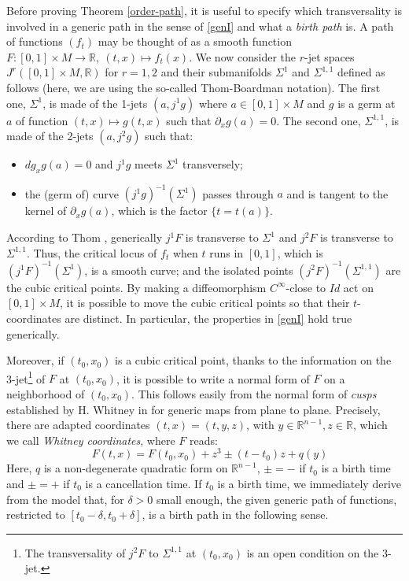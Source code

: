 \documentclass[12pt]{amsart}
\def\R{\mathbb{R}}
\def\de{\delta}
\def\Si{\Sigma}
\begin{document}
Before proving Theorem \ref{order-path}, it is useful to specify which transversality is involved
in a generic path in the sense of \ref{genI} and what a {\it birth path} is. A path of functions 
$\left(f_t\right)$ may be thought 
of as a smooth function $F:[0,1]\times M\to \R, \ (t,x)\mapsto f_t(x)$. We now consider  the 
$r$-jet spaces $J^r([0,1]\times M,\R)$ for $r=1,2$ and their submanifolds
$\Si^1$ and $\Si^{1,1}$ defined as follows (here, we  are using  the so-called Thom-Boardman
notation). The first one, $\Si^1$, is made of the 1-jets $(a,j^1g)$ where  $a\in [0,1]\times M$ and $g$ is
a germ at $a$ of function $(t,x)\mapsto g(t,x)$ such that $\partial_xg (a)=0$. The second one, $\Si^{1,1}$,
is made of the 2-jets $(a,j^2g)$ such that:
\begin{itemize}
\item $dg_xg(a)=0$ and $j^1g$ meets $\Si^1$ transversely; %
\item the (germ of) curve $\left(j^1g\right)^{-1}(\Si^1)$ passes through $a$  and is tangent
 to the kernel of $\partial_xg(a)$, which is the factor $\{t=t(a)\}$.
\end{itemize}

According to Thom \cite{thom56}, generically $j^1F$ is transverse to $\Si^1$ and $j^2F$ is transverse 
to $\Si^{1,1}$. Thus,  the critical locus of $f_t$ when $t$ runs in 
$[0,1]$, which is   $\left(j^1F\right)^{-1}(\Si^1)$, is a   smooth curve; 
and the isolated points $\left(j^2F\right)^{-1}(\Si^{1,1})$ are the cubic critical points.
By making a diffeomorphism  $C^\infty$-close to $Id$ act on  $[0,1]\times M$,
 it is possible to
move the cubic critical points so that their $t$-coordinates are distinct. In particular, 
the properties in \ref{genI} hold true generically.

Moreover, if $(t_0,x_0)$ is a cubic critical point, thanks to the information on the 3-jet\footnote{The transversality of $j^2F$  to $\Si^{1,1}$ at $(t_0,x_0)$ is an open  condition on the 3-jet.}
of $F$ at $(t_0,x_0)$, it is possible to write a normal form of $F$ on a neighborhood of $(t_0,x_0)$.
This follows easily from the normal form of {\it cusps} established  by H. Whitney in \cite{whitney}
for generic maps from plane to plane. Precisely, there are adapted coordinates $(t,x)=(t,y,z)$, with 
$y\in \R^{n-1}, z\in \R$,
which we call {\it Whitney coordinates},
where $F$ reads:
$$\quad F(t,x)= F(t_0,x_0) + z^3\pm (t-t_0)z +q(y)
$$
 Here, $q$ is a non-degenerate quadratic form on $\R^{n-1}$, $\pm=-$ if $t_0$ is a birth time and  $\pm= +$
 if $t_0$ is a cancellation time. If $t_0$ is a birth time,  we immediately derive from the model
 that, for $\de>0$ small enough, the given generic path of functions, restricted to
 $[t_0-\de,t_0+\de]$, is a birth path in the following sense.
\end{document}
